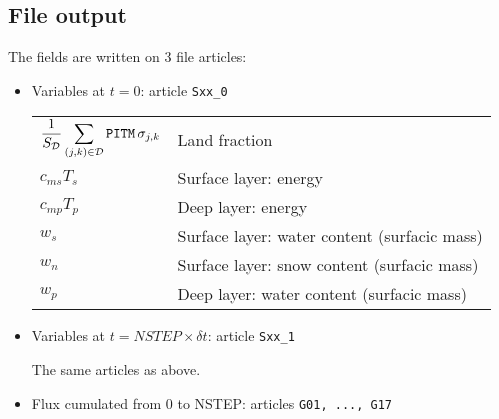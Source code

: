 \subsection*{File output}
The fields are written on 3 file articles:
\begin{itemize}
        \item Variables at $t=0$: article \verb*+Sxx_0+

        \begin{tabular}{ll}
        $\displaystyle \frac{1}{S_{\cal D}}\sum_{(j,k)\in {\cal D}} \mbox{{\tt PITM}}\,\sigma_{j,k}$ & Land fraction  \\
        $c_{ms}T_s$ & Surface layer: energy \\
        $c_{mp}T_p$ & Deep layer: energy \\
        $w_s$ & Surface layer: water content (surfacic mass) \\
        $w_n$ & Surface layer: snow content (surfacic mass) \\
        $w_p$ & Deep layer: water content (surfacic mass)
        \end{tabular}

        \item Variables at $t=NSTEP\times\delta t$: article \verb*+Sxx_1+

        The same articles as above.

      \item Flux cumulated from 0 to NSTEP: articles {\tt G01, ..., G17}


\end{itemize}
